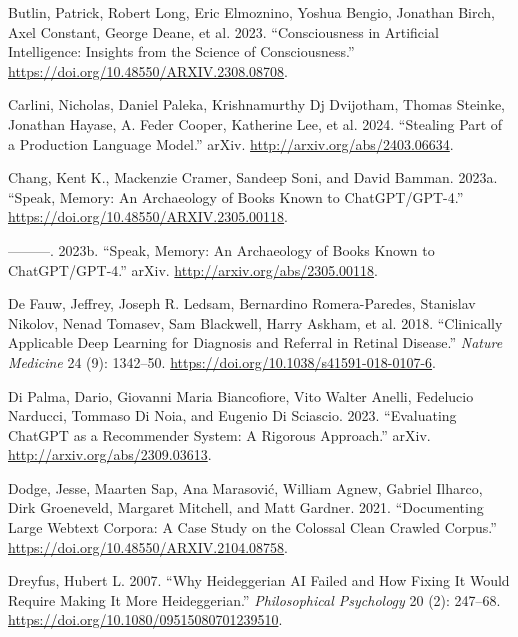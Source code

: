 \documentclass[
  Letterpaper,
]{scrbook}
\newlength{\cslhangindent}
\newenvironment{CSLReferences}[2] %
 {\begin{list}{}{%
  \setlength{\itemindent}{0pt}
  \setlength{\leftmargin}{0pt}
  \setlength{\parsep}{0pt}
  \ifodd #1
   \setlength{\leftmargin}{\cslhangindent}
   \setlength{\itemindent}{-1\cslhangindent}
  \fi
  \setlength{\itemsep}{#2\baselineskip}}}
 {\end{list}}
\begin{document}
\begin{CSLReferences}{1}{0}
Butlin, Patrick, Robert Long, Eric Elmoznino, Yoshua Bengio, Jonathan
Birch, Axel Constant, George Deane, et al. 2023. {``Consciousness in
{Artificial} {Intelligence}: {Insights} from the {Science} of
{Consciousness}.''} \url{https://doi.org/10.48550/ARXIV.2308.08708}.

Carlini, Nicholas, Daniel Paleka, Krishnamurthy Dj Dvijotham, Thomas
Steinke, Jonathan Hayase, A. Feder Cooper, Katherine Lee, et al. 2024.
{``Stealing {Part} of a {Production} {Language} {Model}.''} arXiv.
\url{http://arxiv.org/abs/2403.06634}.

Chang, Kent K., Mackenzie Cramer, Sandeep Soni, and David Bamman. 2023a.
{``Speak, {Memory}: {An} {Archaeology} of {Books} {Known} to
{ChatGPT}/{GPT}-4.''} \url{https://doi.org/10.48550/ARXIV.2305.00118}.

---------. 2023b. {``Speak, {Memory}: {An} {Archaeology} of {Books}
{Known} to {ChatGPT}/{GPT}-4.''} arXiv.
\url{http://arxiv.org/abs/2305.00118}.

De Fauw, Jeffrey, Joseph R. Ledsam, Bernardino Romera-Paredes, Stanislav
Nikolov, Nenad Tomasev, Sam Blackwell, Harry Askham, et al. 2018.
{``Clinically Applicable Deep Learning for Diagnosis and Referral in
Retinal Disease.''} \emph{Nature Medicine} 24 (9): 1342--50.
\url{https://doi.org/10.1038/s41591-018-0107-6}.

Di Palma, Dario, Giovanni Maria Biancofiore, Vito Walter Anelli,
Fedelucio Narducci, Tommaso Di Noia, and Eugenio Di Sciascio. 2023.
{``Evaluating {ChatGPT} as a {Recommender} {System}: {A} {Rigorous}
{Approach}.''} arXiv. \url{http://arxiv.org/abs/2309.03613}.

Dodge, Jesse, Maarten Sap, Ana Marasović, William Agnew, Gabriel
Ilharco, Dirk Groeneveld, Margaret Mitchell, and Matt Gardner. 2021.
{``Documenting {Large} {Webtext} {Corpora}: {A} {Case} {Study} on the
{Colossal} {Clean} {Crawled} {Corpus}.''}
\url{https://doi.org/10.48550/ARXIV.2104.08758}.

Dreyfus, Hubert L. 2007. {``Why {Heideggerian} {AI} {Failed} and {How}
{Fixing} It {Would} {Require} {Making} It {More} {Heideggerian}.''}
\emph{Philosophical Psychology} 20 (2): 247--68.
\url{https://doi.org/10.1080/09515080701239510}.


\end{CSLReferences}
\end{document}
